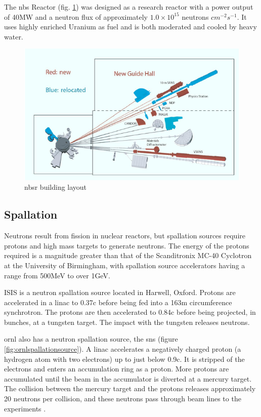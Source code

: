 The \acrlong{nbs} Reactor (fig. \ref{fig:nbsrbeamlines}) was designed as a research reactor with a power output of 40MW and a neutron flux of approximately $1.0 \times 10^{15}$ neutrons $cm^{-2} s^{-1}$.  It uses highly enriched Uranium as fuel and is both moderated and cooled by heavy water. 

\begin{figure}
\begin{center}
\includegraphics[width=.70\linewidth]{chapters/isotope_activation_and_radioactive_decay/images/nbsr.png}
\caption{\acrshort{nbsr} building layout\cite{nbsrhistory}}
\label{fig:nbsrbeamlines}
\end{center}
\end{figure}




\FloatBarrier
\subsection{Spallation}

Neutrons result from fission in nuclear reactors, but spallation sources require protons and high mass targets to generate neutrons.  The energy of the protons required is a magnitude greater than that of the Scanditronix MC-40 Cyclotron at the University of Birmingham, with spallation source accelerators having a range from 500MeV to over 1GeV.  

ISIS is a neutron spallation source located in Harwell, Oxford.  Protons are accelerated in a \acrshort{linac} to 0.37c before being fed into a 163m circumference synchrotron.  The protons are then accelerated to 0.84c before being projected, in bunches, at a tungsten target.  The impact with the tungsten releases neutrons\cite{isisneutronsource}.

\acrlong{ornl} also has a neutron spallation source, the \acrshort{sns} (figure \ref{fig:ornlspallationsource}).  A \acrshort{linac} accelerates a negatively charged proton (a hydrogen atom with two electrons) up to just below 0.9c.  It is stripped of the electrons and enters an accumulation ring as a proton.  More protons are accumulated until the beam in the accumulator is diverted at a mercury target.  The collision between the mercury target and the protons releases approximately 20 neutrons per collision, and these neutrons pass through beam lines to the experiments . 

